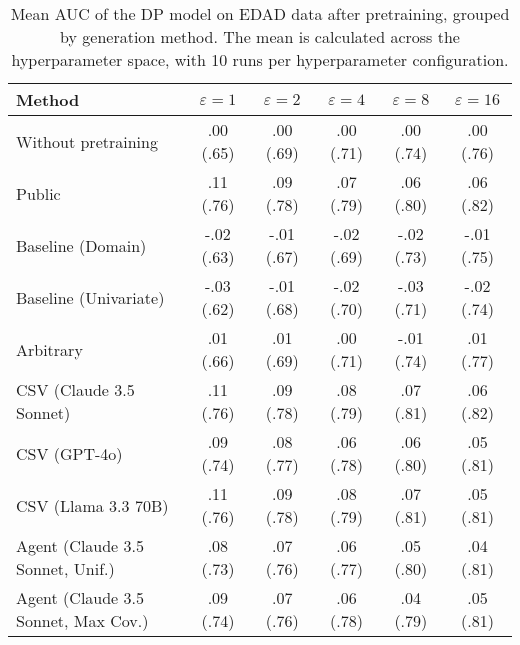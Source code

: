 \begin{table}[h!]
    \centering
    \caption{Mean AUC of the DP model on EDAD data after pretraining, grouped by generation method. The mean is calculated across the hyperparameter space, with 10 runs per hyperparameter configuration.}
    \label{tab:epsilon_comparison}
    \begin{tabular}{lccccc}
    \toprule
    Method & $\varepsilon=1$ & $\varepsilon=2$ & $\varepsilon=4$ & $\varepsilon=8$ & $\varepsilon=16$ \\
    \midrule
    Without pretraining & .00 {\small (.65)} & .00 {\small (.69)} & .00 {\small (.71)} & .00 {\small (.74)} & .00 {\small (.76)} \\
    \arrayrulecolor{black!50!}\midrule
    Public & \cellcolor{bronze!30}.11 {\small (.76)} & \cellcolor{bronze!30}.09 {\small (.78)} & \cellcolor{bronze!30}.07 {\small (.79)} & \cellcolor{bronze!30}.06 {\small (.80)} & \cellcolor{gold!30}.06 {\small (.82)} \\
    \arrayrulecolor{black!50!}\midrule
    Baseline (Domain) & -.02 {\small (.63)} & -.01 {\small (.67)} & -.02 {\small (.69)} & -.02 {\small (.73)} & -.01 {\small (.75)} \\
    Baseline (Univariate) & -.03 {\small (.62)} & -.01 {\small (.68)} & -.02 {\small (.70)} & -.03 {\small (.71)} & -.02 {\small (.74)} \\
    \arrayrulecolor{black!50!}\midrule
    Arbitrary & .01 {\small (.66)} & .01 {\small (.69)} & .00 {\small (.71)} & -.01 {\small (.74)} & .01 {\small (.77)} \\
    \arrayrulecolor{black!50!}\midrule
    CSV (Claude 3.5 Sonnet) & \cellcolor{gold!30}.11 {\small (.76)} & \cellcolor{gold!30}.09 {\small (.78)} & \cellcolor{silver!30}.08 {\small (.79)} & \cellcolor{silver!30}.07 {\small (.81)} & \cellcolor{silver!30}.06 {\small (.82)} \\
    CSV (GPT-4o) & .09 {\small (.74)} & .08 {\small (.77)} & .06 {\small (.78)} & .06 {\small (.80)} & .05 {\small (.81)} \\
    CSV (Llama 3.3 70B) & \cellcolor{silver!30}.11 {\small (.76)} & \cellcolor{silver!30}.09 {\small (.78)} & \cellcolor{gold!30}.08 {\small (.79)} & \cellcolor{gold!30}.07 {\small (.81)} & \cellcolor{bronze!30}.05 {\small (.81)} \\
    \arrayrulecolor{black!50!}\midrule
    Agent (Claude 3.5 Sonnet, Unif.) & .08 {\small (.73)} & .07 {\small (.76)} & .06 {\small (.77)} & .05 {\small (.80)} & .04 {\small (.81)} \\
    Agent (Claude 3.5 Sonnet, Max Cov.) & .09 {\small (.74)} & .07 {\small (.76)} & .06 {\small (.78)} & .04 {\small (.79)} & .05 {\small (.81)} \\

\end{tabular}
\end{table}

